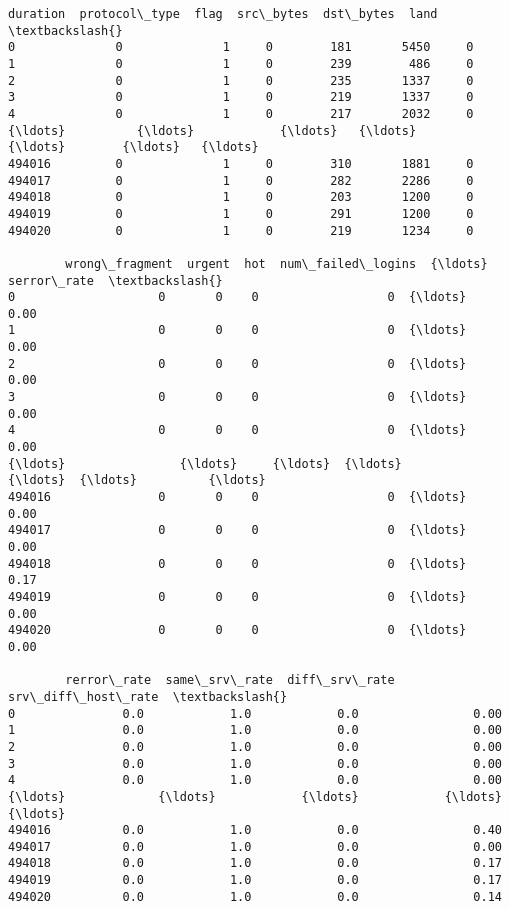 \documentclass[11pt]{article}
\makeatletter
\newcommand{\boxspacing}{\kern\kvtcb@left@rule\kern\kvtcb@boxsep}
\newcommand{\prompt}[4]{
        {\ttfamily\llap{{\color{#2}[#3]:\hspace{3pt}#4}}\vspace{-\baselineskip}}
    }
\makeatother
\begin{document}
            \begin{tcolorbox}[breakable, size=fbox, boxrule=.5pt, pad at break*=1mm, opacityfill=0]
\prompt{Out}{outcolor}{ }{\boxspacing}
\begin{Verbatim}[commandchars=\\\{\}]
        duration  protocol\_type  flag  src\_bytes  dst\_bytes  land  \textbackslash{}
0              0              1     0        181       5450     0
1              0              1     0        239        486     0
2              0              1     0        235       1337     0
3              0              1     0        219       1337     0
4              0              1     0        217       2032     0
{\ldots}          {\ldots}            {\ldots}   {\ldots}        {\ldots}        {\ldots}   {\ldots}
494016         0              1     0        310       1881     0
494017         0              1     0        282       2286     0
494018         0              1     0        203       1200     0
494019         0              1     0        291       1200     0
494020         0              1     0        219       1234     0

        wrong\_fragment  urgent  hot  num\_failed\_logins  {\ldots}  serror\_rate  \textbackslash{}
0                    0       0    0                  0  {\ldots}         0.00
1                    0       0    0                  0  {\ldots}         0.00
2                    0       0    0                  0  {\ldots}         0.00
3                    0       0    0                  0  {\ldots}         0.00
4                    0       0    0                  0  {\ldots}         0.00
{\ldots}                {\ldots}     {\ldots}  {\ldots}                {\ldots}  {\ldots}          {\ldots}
494016               0       0    0                  0  {\ldots}         0.00
494017               0       0    0                  0  {\ldots}         0.00
494018               0       0    0                  0  {\ldots}         0.17
494019               0       0    0                  0  {\ldots}         0.00
494020               0       0    0                  0  {\ldots}         0.00

        rerror\_rate  same\_srv\_rate  diff\_srv\_rate  srv\_diff\_host\_rate  \textbackslash{}
0               0.0            1.0            0.0                0.00
1               0.0            1.0            0.0                0.00
2               0.0            1.0            0.0                0.00
3               0.0            1.0            0.0                0.00
4               0.0            1.0            0.0                0.00
{\ldots}             {\ldots}            {\ldots}            {\ldots}                 {\ldots}
494016          0.0            1.0            0.0                0.40
494017          0.0            1.0            0.0                0.00
494018          0.0            1.0            0.0                0.17
494019          0.0            1.0            0.0                0.17
494020          0.0            1.0            0.0                0.14


\end{Verbatim}
\end{tcolorbox}
\end{document}
